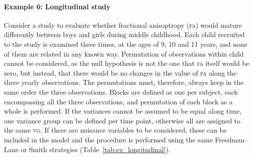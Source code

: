 \paragraph{Example 6: Longitudinal study} Consider a study to evaluate whether fractional anisoptropy (\textsc{fa}) would mature differently between boys and girls during middle childhood. Each child recruited to the study is examined three times, at the ages of 9, 10 and 11 years, and none of them are related in any known way. Permutation of observations within child cannot be considered, as the null hypothesis is not the one that \textsc{fa} itself would be zero, but instead, that there would be no changes in the value of \textsc{fa} along the three yearly observations. The permutations must, therefore, always keep in the same order the three observations. Blocks are defined as one per subject, each encompassing all the three observations, and permutation of each block as a whole is performed. If the variances cannot be assumed to be equal along time, one variance group can be defined per time point, otherwise all are assigned to the same \textsc{vg}. If there are nuisance variables to be considered, these can be included in the model and the procedure is performed using the same Freedman--Lane or Smith strategies (Table~\ref{tab:ex_longitudinal}).

